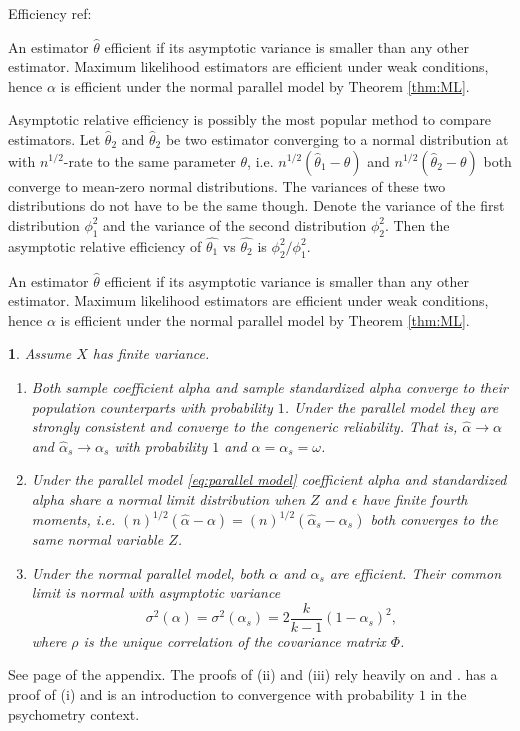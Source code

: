 \documentclass{article}
\makeatletter
\theoremstyle{plain}
\newtheorem{thm}{\protect\theoremname}
\theoremstyle{plain}
\theoremstyle{definition}
\theoremstyle{remark}
\theoremstyle{definition}
\theoremstyle{plain}
\theoremstyle{plain}
\theoremstyle{definition}
\newenvironment{proof}[1][\protect\proofname]{\par
	\normalfont\topsep6\p@\@plus6\p@\relax
	\trivlist
	\itemindent\parindent
	\item[\hskip\labelsep\scshape #1]\ignorespaces
}{%
	\endtrivlist\@endpefalse
}
\providecommand{\proofname}{Proof}
\providecommand{\theoremname}{Theorem}
\renewcommand{\sqrt}[1]{{(#1)^{1/2}}}
\makeatother
\begin{document}
Efficiency ref: \citep[][Section 4.3]{Lehmann2004-ke}

An estimator $\hat{\theta}$ efficient if its asymptotic variance is smaller than any other estimator. Maximum likelihood estimators are efficient under weak conditions, hence $\alpha$ is efficient under the normal parallel model by Theorem \ref{thm:ML}.

Asymptotic relative efficiency is possibly the most popular method to compare estimators. Let $\hat{\theta}_2$ and $\hat{\theta}_2$ be two estimator converging to a normal distribution at with $n^{1/2}$-rate to the same parameter $\theta$, i.e. 
$n^{1/2}{(\hat{\theta}_1 - \theta)}$ and $n^{1/2}{(\hat{\theta}_2 - \theta)}$ both converge to mean-zero normal distributions. The variances of these two distributions do not have to be the same though. Denote the variance of the first distribution $\phi_1^2$ and the variance of the second distribution $\phi_2^2$. Then the asymptotic relative efficiency of $\hat{\theta_1}$ vs $\hat{\theta_2}$ is $\phi_2^2/\phi_1^2$.

An estimator $\hat{\theta}$ efficient if its asymptotic variance is smaller than any other estimator. Maximum likelihood estimators are efficient under weak conditions, hence $\alpha$ is efficient under the normal parallel model by Theorem \ref{thm:ML}.

\begin{thm}
\label{thm:asymptotics}
Assume $X$ has finite variance. 
\begin{enumerate}[label=(\roman*)]
    \item Both sample coefficient alpha and sample standardized alpha converge to their population counterparts with probability $1$. Under the parallel model they are strongly consistent and converge to the congeneric reliability. That is, $\hat{\alpha}\to\alpha$ and $\hat{\alpha}_s\to\alpha_s$ with probability $1$ and $\alpha = \alpha_s = \omega$.
    \item Under the parallel model \eqref{eq:parallel model} coefficient alpha and standardized alpha share a normal limit distribution when $Z$ and $\epsilon$ have finite fourth moments, i.e. $\sqrt{n}(\hat{\alpha} - \alpha) = \sqrt{n}(\hat{\alpha}_s - \alpha_s)$ both converges to the same normal variable $Z$.
    \item Under the normal parallel model, both $\alpha$ and $\alpha_s$ are efficient. Their common limit is normal with asymptotic variance 
    $$\sigma^{2}\left(\alpha\right)= \sigma^{2}\left(\alpha_{s}\right)=2\frac{k}{k-1}\left(1-\alpha_{s}\right)^{2},$$
    where $\rho$ is the unique correlation of the covariance matrix $\Phi$.
\end{enumerate}
\end{thm}    
\begin{proof}
See page \pageref{proof:asymptotics} of the appendix. The proofs of (ii) and (iii) rely heavily on \citep{Van_Zyl2000-si} and \citep{hayashi2005note}. \citep{Raykov2019-tv} has a proof of (i) and is an introduction to convergence with probability $1$ in the psychometry context.
\end{proof}
\end{document}
